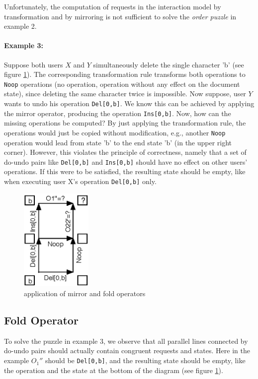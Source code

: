 Unfortunately, the computation of requests in the interaction model by transformation and by mirroring is not sufficient to solve the \emph{order puzzle} in example 2.

\paragraph{Example 3:} 
\label{example3}
Suppose both users $X$ and $Y$ simultaneously delete the single character 'b' (see figure \ref{fig:concepts.basicfold}). The corresponding transformation rule transforms both operations to \texttt{Noop} operations (no operation, operation without any effect on the document state), since deleting the same character twice is impossible. Now suppose, user $Y$ wants to undo his operation \texttt{Del[0,b]}. We know this can be achieved by applying the mirror operator, producing the operation \texttt{Ins[0,b]}. Now, how can the missing operations be computed? By just applying the transformation rule, the operations would just be copied without modification, e.g., another \texttt{Noop} operation would lead from state 'b' to the end state 'b' (in the upper right corner). However, this violates the principle of correctness, namely that a set of do-undo pairs like \texttt{Del[0,b]} and \texttt{Ins[0,b]} should have no effect on other users' operations. If this were to be satisfied, the resulting state should be empty, like when executing user X's operation \texttt{Del[0,b]} only. 

\begin{figure}[htb]
 \centering
 \includegraphics[width=3.45cm,height=4.97cm]{../../images/concepts_basicfold.eps}
 \caption{application of mirror and fold operators}
 \label{fig:concepts.basicfold}
\end{figure}


\subsection{Fold Operator}
To solve the puzzle in example 3, we observe that all parallel lines connected by do-undo pairs should actually contain congruent requests and states. Here in the example $O_{1}''$ should be \texttt{Del[0,b]}, and the resulting state should be empty, like the operation and the state at the bottom of the diagram (see figure \ref{fig:concepts.basicfold}).

